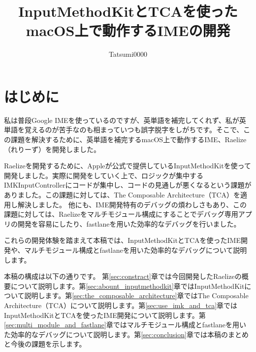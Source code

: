 \documentclass[uplatex,a4j,12pt]{jsarticle}
\begin{document}
\title{\vspace{-10mm}InputMethodKitとTCAを使ったmacOS上で動作するIMEの開発}
\author{Tatsumi0000}
\date{}
\maketitle


\section{はじめに}\label{sec:intro}
私は普段Google IMEを使っているのですが、英単語を補完してくれず、私が英単語を覚えるのが苦手なのも相まっていつも誤字脱字をしがちです。そこで、この課題を解決するために、英単語を補完するmacOS上で動作するIME、Raelize（れりーず）を開発しました。

Raelizeを開発するために、Appleが公式で提供しているInputMethodKit\cite{bib:about_inputmethodkit}を使って開発しました。実際に開発をしていく上で、ロジックが集中するIMKInputControllerにコードが集中し、コードの見通しが悪くなるという課題がありました。この課題に対しては、The Composable Architecture（TCA）\cite{bib:the_composable_architecture}を適用し解決しました。
他にも、IME開発特有のデバッグの煩わしさもあり、この課題に対しては、Raelizeをマルチモジュール構成にすることでデバッグ専用アプリの開発を容易にしたり、fastlane\cite{bib:fastlane}を用いた効率的なデバッグを行いました。

これらの開発体験を踏まえて本稿では、InputMethodKitとTCAを使ったIME開発や、マルチモジュール構成とfastlaneを用いた効率的なデバッグについて説明します。

本稿の構成は以下の通りです。
第\ref{sec:constract}章では今回開発したRaelizeの概要について説明します。第\ref{sec:abount_inputmethodkit}章ではInputMethodKitについて説明します。第\ref{sec:the_composable_architecture}章ではThe Composable Architecture（TCA）について説明します。第\ref{sec:use_imk_and_tca}章ではInputMethodKitとTCAを使ったIME開発について説明します。第\ref{sec:multi_module_and_fastlane}章ではマルチモジュール構成とfastlaneを用いた効率的なデバッグについて説明します。第\ref{sec:conclusion}章では本稿のまとめと今後の課題を示します。

\end{document}
